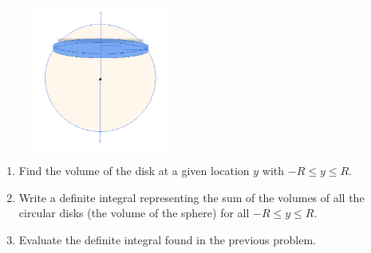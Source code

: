 \documentclass[12pt,letterpaper,fleqn]{article}
\begin{document}
\begin{enumerate}
       \begin{figure}[!htb]
        \includegraphics[width=0.4\textwidth]{img/sphere_vol_by_disks.png}
       \end{figure}
       \begin{enumerate}
        \item Find the volume of the disk at a given location $y$ with $-R \leq y \leq R$.
        \item Write a definite integral representing the sum of the volumes of all the circular disks (the volume of the sphere) for all $-R \leq y \leq R$.
        \item Evaluate the definite integral found in the previous problem.
       \end{enumerate}
\end{enumerate}
\end{document}
